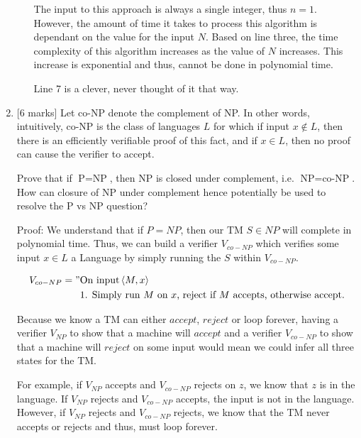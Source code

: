 \documentclass{article}
\newcommand{\class}[1]{\text{#1}}
\newcommand{\enc}[1]{\left<#1\right>}
\begin{document}
\begin{enumerate}
\begin{enumerate}
            The input to this approach is always a single integer, thus $n = 1$.
            However, the amount of time it takes to process this algorithm is dependant on the value for the input $N$.
            Based on line three, the time complexity of this algorithm increases as the value of $N$ increases.
            This increase is exponential and thus, cannot be done in polynomial time.

            Line 7 is a clever, never thought of it that way.

    \end{enumerate}
    \item {[6 marks]}
          Let co-NP denote the complement of NP. In other words, intuitively, co-NP is the class of languages $L$ for which if input $x\not\in L$, then there is an efficiently verifiable proof of this fact, and if $x\in L$, then no proof can cause the verifier to accept.

            Prove that if $\class{P}=\class{NP}$, then NP is closed under complement, i.e. $\class{NP}=\class{co-NP}$. How can closure of NP under complement hence potentially be used to resolve the P vs NP question?

            Proof: We understand that if $P = NP$, then our TM $S \in NP$ will complete in polynomial time. Thus, we can build a verifier $V_{co-NP}$ which verifies some input $x \in L$ a Language by simply running the $S$ within $V_{co-NP}$.
            
            \begin{equation}
            	\begin{split}
            		V_{co-NP} = "& \text{On input} \enc{M, x} \\
            				     & \text{1. Simply run $M$ on $x$, reject if $M$ accepts, otherwise accept.}
            	\end{split}
            \end{equation}
            
            Because we know a TM can either $accept$, $reject$ or loop forever, having a verifier $V_{NP}$ to show that a machine will $accept$ and a verifier $V_{co-NP}$ to show that a machine will $reject$ on some input would mean we could infer all three states for the TM.
            
            For example, if $V_{NP}$ accepts and $V_{co-NP}$ rejects on $z$, we know that $z$ is in the language. If $V_{NP}$ rejects and $V_{co-NP}$ accepts, the input is not in the language. However, if $V_{NP}$ rejects and $V_{co-NP}$ rejects, we know that the TM never accepts or rejects and thus, must loop forever.


\end{enumerate}
\end{document}
